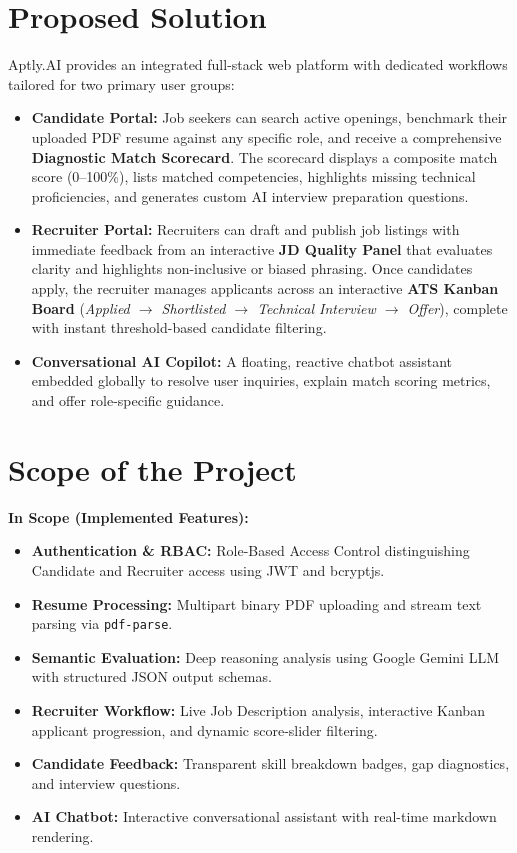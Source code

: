 \documentclass[12pt, a4paper]{article}
\begin{document}
\section{Proposed Solution}
Aptly.AI provides an integrated full-stack web platform with dedicated workflows tailored for two primary user groups:
\begin{itemize}[leftmargin=1.5em]
    \item \textbf{Candidate Portal:} Job seekers can search active openings, benchmark their uploaded PDF resume against any specific role, and receive a comprehensive \textbf{Diagnostic Match Scorecard}. The scorecard displays a composite match score (0--100\%), lists matched competencies, highlights missing technical proficiencies, and generates custom AI interview preparation questions.
    \item \textbf{Recruiter Portal:} Recruiters can draft and publish job listings with immediate feedback from an interactive \textbf{JD Quality Panel} that evaluates clarity and highlights non-inclusive or biased phrasing. Once candidates apply, the recruiter manages applicants across an interactive \textbf{ATS Kanban Board} (\textit{Applied $\rightarrow$ Shortlisted $\rightarrow$ Technical Interview $\rightarrow$ Offer}), complete with instant threshold-based candidate filtering.
    \item \textbf{Conversational AI Copilot:} A floating, reactive chatbot assistant embedded globally to resolve user inquiries, explain match scoring metrics, and offer role-specific guidance.
\end{itemize}

\section{Scope of the Project}

\textbf{In Scope (Implemented Features):}
\begin{itemize}[leftmargin=1.5em, itemsep=2pt]
    \item \textbf{Authentication \& RBAC:} Role-Based Access Control distinguishing Candidate and Recruiter access using JWT and bcryptjs.
    \item \textbf{Resume Processing:} Multipart binary PDF uploading and stream text parsing via \texttt{pdf-parse}.
    \item \textbf{Semantic Evaluation:} Deep reasoning analysis using Google Gemini LLM with structured JSON output schemas.
    \item \textbf{Recruiter Workflow:} Live Job Description analysis, interactive Kanban applicant progression, and dynamic score-slider filtering.
    \item \textbf{Candidate Feedback:} Transparent skill breakdown badges, gap diagnostics, and interview questions.
    \item \textbf{AI Chatbot:} Interactive conversational assistant with real-time markdown rendering.
\end{itemize}
\end{document}
